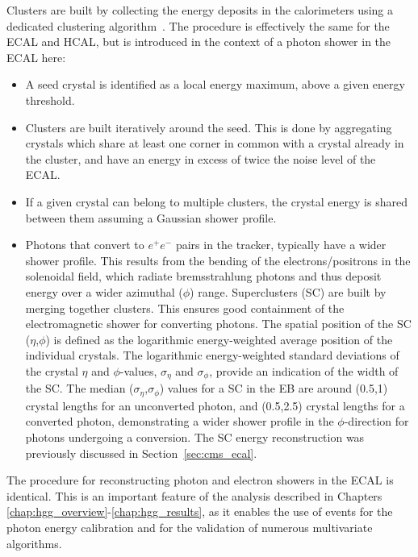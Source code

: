 Clusters are built by collecting the energy deposits in the calorimeters using a dedicated clustering algorithm~\cite{Khachatryan:2015hwa}. The procedure is effectively the same for the ECAL and HCAL, but is introduced in the context of a photon shower in the ECAL here:
\begin{itemize}
    \item A seed crystal is identified as a local energy maximum, above a given energy threshold.
    \item Clusters are built iteratively around the seed. This is done by aggregating crystals which share at least one corner in common with a crystal already in the cluster, and have an energy in excess of twice the noise level of the ECAL.
    \item If a given crystal can belong to multiple clusters, the crystal energy is shared between them assuming a Gaussian shower profile.
    \item Photons that convert to $e^+e^-$ pairs in the tracker, typically have a wider shower profile. This results from the bending of the electrons/positrons in the solenoidal field, which radiate bremsstrahlung photons and thus deposit energy over a wider azimuthal ($\phi$) range. Superclusters (SC) are built by merging together clusters. This ensures good containment of the electromagnetic shower for converting photons. The spatial position of the SC ($\eta$,$\phi$) is defined as the logarithmic energy-weighted average position of the individual crystals. The logarithmic energy-weighted standard deviations of the crystal $\eta$ and $\phi$-values, $\sigma_{\eta}$ and $\sigma_{\phi}$, provide an indication of the width of the SC. The median ($\sigma_{\eta}$,$\sigma_{\phi}$) values for a SC in the EB are around (0.5,1) crystal lengths for an unconverted photon, and (0.5,2.5) crystal lengths for a converted photon, demonstrating a wider shower profile in the $\phi$-direction for photons undergoing a conversion. The SC energy reconstruction was previously discussed in Section~\ref{sec:cms_ecal}.
\end{itemize}
\noindent
The procedure for reconstructing photon and electron showers in the ECAL is identical. This is an important feature of the \Hgg analysis described in Chapters \ref{chap:hgg_overview}-\ref{chap:hgg_results}, as it enables the use of \Zee events for the photon energy calibration and for the validation of numerous multivariate algorithms.

